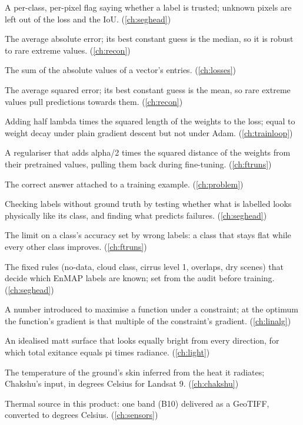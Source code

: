 \begin{description}[style=nextline,leftmargin=1.2em,font=\normalfont\bfseries]
\item[Known mask] A per-class, per-pixel flag saying whether a label is trusted; unknown pixels are left out of the loss and the IoU. (\cref{ch:seghead})
\item[L1 loss] The average absolute error; its best constant guess is the median, so it is robust to rare extreme values. (\cref{ch:recon})
\item[L1 norm] The sum of the absolute values of a vector's entries. (\cref{ch:losses})
\item[L2 loss] The average squared error; its best constant guess is the mean, so rare extreme values pull predictions towards them. (\cref{ch:recon})
\item[L2 regularisation] Adding half lambda times the squared length of the weights to the loss; equal to weight decay under plain gradient descent but not under Adam. (\cref{ch:trainloop})
\item[L2-SP] A regulariser that adds alpha/2 times the squared distance of the weights from their pretrained values, pulling them back during fine-tuning. (\cref{ch:ftruns})
\item[Label] The correct answer attached to a training example. (\cref{ch:problem})
\item[Label audit] Checking labels without ground truth by testing whether what is labelled looks physically like its class, and finding what predicts failures. (\cref{ch:seghead})
\item[Label ceiling] The limit on a class's accuracy set by wrong labels: a class that stays flat while every other class improves. (\cref{ch:ftruns})
\item[Label policy] The fixed rules (no-data, cloud class, cirrus level 1, overlaps, dry scenes) that decide which EnMAP labels are known; set from the audit before training. (\cref{ch:seghead})
\item[Lagrange multiplier] A number introduced to maximise a function under a constraint; at the optimum the function's gradient is that multiple of the constraint's gradient. (\cref{ch:linalg})
\item[Lambertian surface] An idealised matt surface that looks equally bright from every direction, for which total exitance equals pi times radiance. (\cref{ch:light})
\item[Land surface temperature] The temperature of the ground's skin inferred from the heat it radiates; Chakshu's input, in degrees Celsius for Landsat 9. (\cref{ch:chakshu})
\item[Landsat 9] Thermal source in this product: one band (B10) delivered as a GeoTIFF, converted to degrees Celsius. (\cref{ch:sensors})

\end{description}
